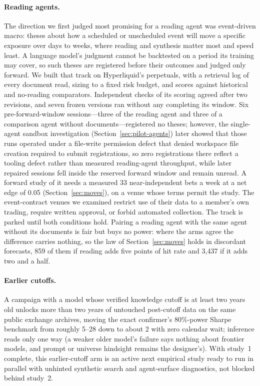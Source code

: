 \documentclass[11pt]{article}
\begin{document}
\paragraph{Reading agents.} The direction we first judged most promising for a reading agent was event-driven macro: theses about how a scheduled or unscheduled event will move a specific exposure over days to weeks, where reading and synthesis matter most and speed least. A language model's judgment cannot be backtested on a period its training may cover, so such theses are registered before their outcomes and judged only forward. We built that track on Hyperliquid's perpetuals, with a retrieval log of every document read, sizing to a fixed risk budget, and scores against historical and no-reading comparators. Independent checks of its scoring agreed after two revisions, and seven frozen versions ran without any completing its window. Six pre-forward-window sessions---three of the reading agent and three of a comparison agent without documents---registered no theses; however, the single-agent sandbox investigation (Section~\ref{sec:pilot-agents}) later showed that those runs operated under a file-write permission defect that denied workspace file creation required to submit registrations, so zero registrations there reflect a tooling defect rather than measured reading-agent throughput, while later repaired sessions fell inside the reserved forward window and remain unread. A forward study of it needs a measured 33 near-independent bets a week at a net edge of 0.05 (Section~\ref{sec:moves}), on a venue whose terms permit the study. The event-contract venues we examined restrict use of their data to a member's own trading, require written approval, or forbid automated collection. The track is parked until both conditions hold. Pairing a reading agent with the same agent without its documents is fair but buys no power: where the arms agree the difference carries nothing, so the law of Section~\ref{sec:moves} holds in discordant forecasts, 859 of them if reading adds five points of hit rate and 3{,}437 if it adds two and a half.

\paragraph{Earlier cutoffs.} A campaign with a model whose verified knowledge cutoff is at least two years old unlocks more than two years of untouched post-cutoff data on the same public exchange archives, moving the exact confirmer's 80\%-power Sharpe benchmark from roughly 5--28 down to about 2 with zero calendar wait; inference reads only one way (a weaker older model's failure says nothing about frontier models, and prompt or universe hindsight remains the designer's). With study~1 complete, this earlier-cutoff arm is an active next empirical study ready to run in parallel with unhinted synthetic search and agent-surface diagnostics, not blocked behind study~2.
\end{document}
